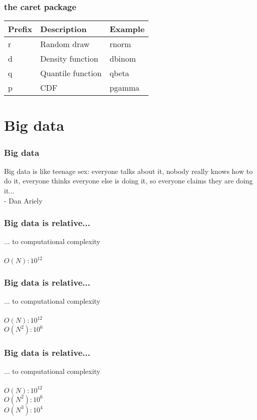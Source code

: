 \documentclass{beamer}
\begin{document}
\begin{frame}
	\frametitle{the caret package}
	\begin{center}
	\begin{table}
		\begin{tabular}{l | l | l}
			\textbf{Prefix} & \textbf{Description} & \textbf{Example}\\
			\hline
			r & Random draw & rnorm \\
			\hline
			d & Density function & dbinom \\
			\hline
			q & Quantile function & qbeta \\
			\hline
			p & CDF & pgamma \\
		\end{tabular}
	\end{table}
\end{center}
\end{frame}

\section{Big data}

\begin{frame}
	\frametitle{Big data}
	Big data is like teenage sex:
	everyone talks about it,
	nobody really knows how to do it,
	everyone thinks everyone else is doing it,
	so everyone claims they are doing it...\\
	- Dan Ariely
\end{frame}

\begin{frame}
	\frametitle{Big data is relative...}
	\begin{center}
		... to computational complexity\\~\\
		$O(N):10^{12}$
	\end{center}
\end{frame}

\begin{frame}
	\frametitle{Big data is relative...}
	\begin{center}
		... to computational complexity\\~\\
		$O(N):10^{12}$\\
		$O(N^2):10^{6}$
	\end{center}
\end{frame}

\begin{frame}
	\frametitle{Big data is relative...}
	\begin{center}
		... to computational complexity\\~\\
		$O(N):10^{12}$\\
		$O(N^2):10^{6}$\\
		$O(N^3):10^{4}$\\
	\end{center}
\end{frame}
\end{document}
